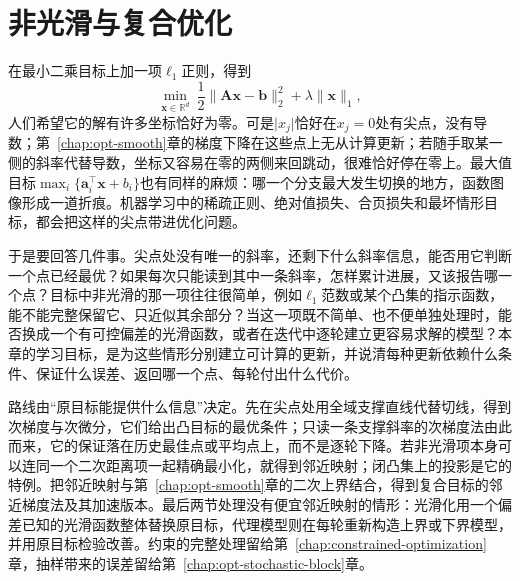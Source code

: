 \chapter{非光滑与复合优化}
\label{chap:opt-nonsmooth}

在最小二乘目标上加一项$\ell_1$正则，得到
\[
 \min_{\bm x\in\mathbb R^d}\ \frac12\lVert\bm A\bm x-\bm b\rVert_2^2+\lambda\lVert\bm x\rVert_1,
\]
人们希望它的解有许多坐标恰好为零。可是$\lvert x_j\rvert$恰好在$x_j=0$处有尖点，没有导数；第~\ref{chap:opt-smooth}章的梯度下降在这些点上无从计算更新；若随手取某一侧的斜率代替导数，坐标又容易在零的两侧来回跳动，很难恰好停在零上。最大值目标$\max_i\{\bm a_i^\top\bm x+b_i\}$也有同样的麻烦：哪一个分支最大发生切换的地方，函数图像形成一道折痕。机器学习中的稀疏正则、绝对值损失、合页损失和最坏情形目标，都会把这样的尖点带进优化问题。

于是要回答几件事。尖点处没有唯一的斜率，还剩下什么斜率信息，能否用它判断一个点已经最优？如果每次只能读到其中一条斜率，怎样累计进展，又该报告哪一个点？目标中非光滑的那一项往往很简单，例如$\ell_1$范数或某个凸集的指示函数，能不能完整保留它、只近似其余部分？当这一项既不简单、也不便单独处理时，能否换成一个有可控偏差的光滑函数，或者在迭代中逐轮建立更容易求解的模型？本章的学习目标，是为这些情形分别建立可计算的更新，并说清每种更新依赖什么条件、保证什么误差、返回哪一个点、每轮付出什么代价。

路线由“原目标能提供什么信息”决定。先在尖点处用全域支撑直线代替切线，得到次梯度与次微分，它们给出凸目标的最优条件；只读一条支撑斜率的次梯度法由此而来，它的保证落在历史最佳点或平均点上，而不是逐轮下降。若非光滑项本身可以连同一个二次距离项一起精确最小化，就得到邻近映射；闭凸集上的投影是它的特例。把邻近映射与第~\ref{chap:opt-smooth}章的二次上界结合，得到复合目标的邻近梯度法及其加速版本。最后两节处理没有便宜邻近映射的情形：光滑化用一个偏差已知的光滑函数整体替换原目标，代理模型则在每轮重新构造上界或下界模型，并用原目标检验改善。约束的完整处理留给第~\ref{chap:constrained-optimization}章，抽样带来的误差留给第~\ref{chap:opt-stochastic-block}章。








